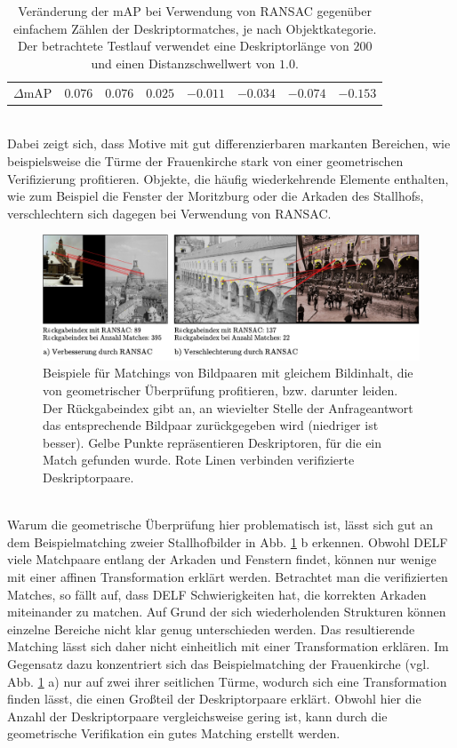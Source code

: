 \begin{table}[]
{\begin{tabular}{cccccccc}
\large{$\Delta$mAP} & \large{$0.076$} & \large{$0.076$} & \large{$0.025$} & \large{$-0.011$} & \large{$-0.034$} & \large{$-0.074$} & \large{$-0.153$}\\              
\end{tabular}
}
\setlength\tabcolsep{6pt}
\caption{Veränderung der mAP bei Verwendung von RANSAC gegenüber einfachem Zählen der Deskriptormatches, je nach Objektkategorie. Der betrachtete Testlauf verwendet eine Deskriptorlänge von $200$ und einen Distanzschwellwert von $1.0$.}
\label{scoring_mAP_change_by_category}
\end{table}
\\
Dabei zeigt sich, dass Motive mit gut differenzierbaren markanten Bereichen, wie beispielsweise die Türme der Frauenkirche stark von einer geometrischen Verifizierung profitieren. Objekte, die häufig wiederkehrende Elemente enthalten, wie zum Beispiel die Fenster der Moritzburg oder die Arkaden des Stallhofs, verschlechtern sich dagegen bei Verwendung von RANSAC.
\begin{figure}[h]
\includegraphics[scale=0.595]{where_ransac_shines}
\caption{Beispiele für Matchings von Bildpaaren mit gleichem Bildinhalt, die von geometrischer Überprüfung profitieren, bzw. darunter leiden. Der Rückgabeindex gibt an, an wievielter Stelle der Anfrageantwort das entsprechende Bildpaar zurückgegeben wird (niedriger ist besser). Gelbe Punkte repräsentieren Deskriptoren, für die ein Match gefunden wurde. Rote Linen verbinden verifizierte Deskriptorpaare.}
\label{where_ransac_shines}
\end{figure}
\\
Warum die geometrische Überprüfung hier problematisch ist, lässt sich gut an dem Beispielmatching zweier Stallhofbilder in Abb. \ref{where_ransac_shines} b erkennen. Obwohl DELF viele Matchpaare entlang der Arkaden und Fenstern findet, können nur wenige mit einer affinen Transformation erklärt werden. Betrachtet man die verifizierten Matches, so fällt auf, dass DELF Schwierigkeiten hat, die korrekten Arkaden miteinander zu matchen. Auf Grund der sich wiederholenden Strukturen können einzelne Bereiche nicht klar genug unterschieden werden. Das resultierende Matching lässt sich daher nicht einheitlich mit einer Transformation erklären. Im Gegensatz dazu konzentriert sich das Beispielmatching der Frauenkirche (vgl. Abb. \ref{where_ransac_shines} a) nur auf zwei ihrer seitlichen Türme, wodurch sich eine Transformation finden lässt, die einen Großteil der Deskriptorpaare erklärt. Obwohl hier die Anzahl der Deskriptorpaare vergleichsweise gering ist, kann durch die geometrische Verifikation ein gutes Matching erstellt werden.
